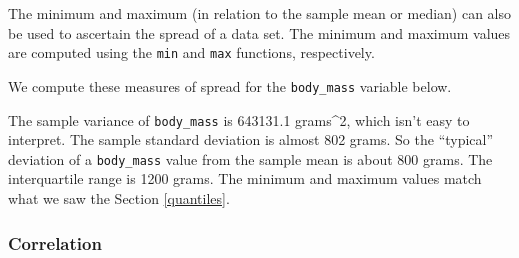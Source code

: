 \documentclass[
]{book}
\newenvironment{Shaded}{\begin{snugshade}}{\end{snugshade}}
\newcommand{\AttributeTok}[1]{\textcolor[rgb]{0.77,0.63,0.00}{#1}}
\newcommand{\CommentTok}[1]{\textcolor[rgb]{0.56,0.35,0.01}{\textit{#1}}}
\newcommand{\ConstantTok}[1]{\textcolor[rgb]{0.00,0.00,0.00}{#1}}
\newcommand{\DocumentationTok}[1]{\textcolor[rgb]{0.56,0.35,0.01}{\textbf{\textit{#1}}}}
\newcommand{\FloatTok}[1]{\textcolor[rgb]{0.00,0.00,0.81}{#1}}
\newcommand{\FunctionTok}[1]{\textcolor[rgb]{0.00,0.00,0.00}{#1}}
\newcommand{\NormalTok}[1]{#1}
\newcommand{\SpecialCharTok}[1]{\textcolor[rgb]{0.00,0.00,0.00}{#1}}
\theoremstyle{definition}
\theoremstyle{definition}
\theoremstyle{definition}
\theoremstyle{definition}
\theoremstyle{remark}
\begin{document}
The minimum and maximum (in relation to the sample mean or median) can also be used to ascertain the spread of a data set. The minimum and maximum values are computed using the \texttt{min} and \texttt{max} functions, respectively.

We compute these measures of spread for the \texttt{body\_mass} variable below.

\begin{Shaded}
\end{Shaded}

The sample variance of \texttt{body\_mass} is 643131.1 grams\^{}2, which isn't easy to interpret. The sample standard deviation is almost 802 grams. So the ``typical'' deviation of a \texttt{body\_mass} value from the sample mean is about 800 grams. The interquartile range is 1200 grams. The minimum and maximum values match what we saw the Section \ref{quantiles}.

\hypertarget{correlation}{%
\subsubsection{Correlation}\label{correlation}}
\end{document}

